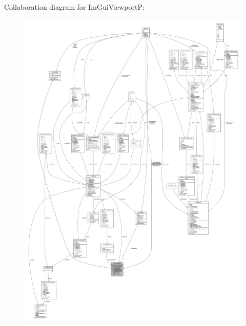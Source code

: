 Collaboration diagram for Im\+Gui\+ViewportP\+:
\nopagebreak
\begin{figure}[H]
\begin{center}
\leavevmode
\includegraphics[width=350pt]{structImGuiViewportP__coll__graph}
\end{center}
\end{figure}
